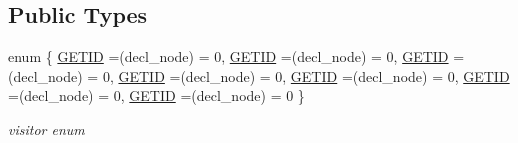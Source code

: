 \subsection*{Public Types}
\begin{DoxyCompactItemize}
\item 
enum \{ \newline
\hyperlink{structfunction__decl_a18d627c0b2293ae1ca973fd86b1e9ca7a5b640324255e28e847b7416f6866de11}{G\+E\+T\+ID} =(decl\+\_\+node) = 0, 
\hyperlink{structfunction__decl_a18d627c0b2293ae1ca973fd86b1e9ca7a5b640324255e28e847b7416f6866de11}{G\+E\+T\+ID} =(decl\+\_\+node) = 0, 
\hyperlink{structfunction__decl_a18d627c0b2293ae1ca973fd86b1e9ca7a5b640324255e28e847b7416f6866de11}{G\+E\+T\+ID} =(decl\+\_\+node) = 0, 
\hyperlink{structfunction__decl_a18d627c0b2293ae1ca973fd86b1e9ca7a5b640324255e28e847b7416f6866de11}{G\+E\+T\+ID} =(decl\+\_\+node) = 0, 
\newline
\hyperlink{structfunction__decl_a18d627c0b2293ae1ca973fd86b1e9ca7a5b640324255e28e847b7416f6866de11}{G\+E\+T\+ID} =(decl\+\_\+node) = 0, 
\hyperlink{structfunction__decl_a18d627c0b2293ae1ca973fd86b1e9ca7a5b640324255e28e847b7416f6866de11}{G\+E\+T\+ID} =(decl\+\_\+node) = 0, 
\hyperlink{structfunction__decl_a18d627c0b2293ae1ca973fd86b1e9ca7a5b640324255e28e847b7416f6866de11}{G\+E\+T\+ID} =(decl\+\_\+node) = 0
 \}\begin{DoxyCompactList}\small\item\em visitor enum \end{DoxyCompactList}
\end{DoxyCompactItemize}
